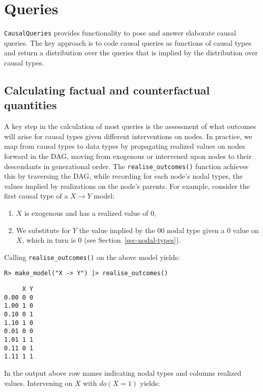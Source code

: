 \documentclass[
  11pt,
  article]{jss}
\providecommand{\tightlist}{%
  \setlength{\itemsep}{0pt}\setlength{\parskip}{0pt}}\usepackage{longtable,booktabs,array}
\begin{document}
\hypertarget{sec-query}{%
\section{Queries}\label{sec-query}}

\texttt{CausalQueries} provides functionality to pose and answer
elaborate causal queries. The key approach is to code causal queries as
functions of causal types and return a distribution over the queries
that is implied by the distribution over causal types.

\hypertarget{sec-propagation}{%
\subsection{Calculating factual and counterfactual
quantities}\label{sec-propagation}}

A key step in the calculation of most queries is the assessment of what
outcomes will arise for causal types given different interventions on
nodes. In practice, we map from causal types to data types by
propagating realized values on nodes forward in the DAG, moving from
exogenous or intervened upon nodes to their descendants in generational
order. The \texttt{realise\_outcomes()} function achieves this by
traversing the DAG, while recording for each node's nodal types, the
values implied by realizations on the node's parents. For example,
consider the first causal type of a \(X \rightarrow Y\) model:

\begin{enumerate}
\def\labelenumi{\arabic{enumi}.}
\tightlist
\item
  \(X\) is exogenous and has a realized value of \(0\),
\item
  We substitute for \(Y\) the value implied by the \(00\) nodal type
  given a \(0\) value on \(X\), which in turn is \(0\) (see
  Section~\ref{sec-nodal-types}).
\end{enumerate}

Calling \texttt{realise\_outcomes()} on the above model yields:

\begin{verbatim}
R> make_model("X -> Y") |> realise_outcomes()
\end{verbatim}

\begin{verbatim}
     X Y
0.00 0 0
1.00 1 0
0.10 0 1
1.10 1 0
0.01 0 0
1.01 1 1
0.11 0 1
1.11 1 1
\end{verbatim}

In the output above row names indicating nodal types and columns
realized values. Intervening on \(X\)
\citep[see][]{pearl_causality_2009} with \(do(X=1)\) yields:
\end{document}
